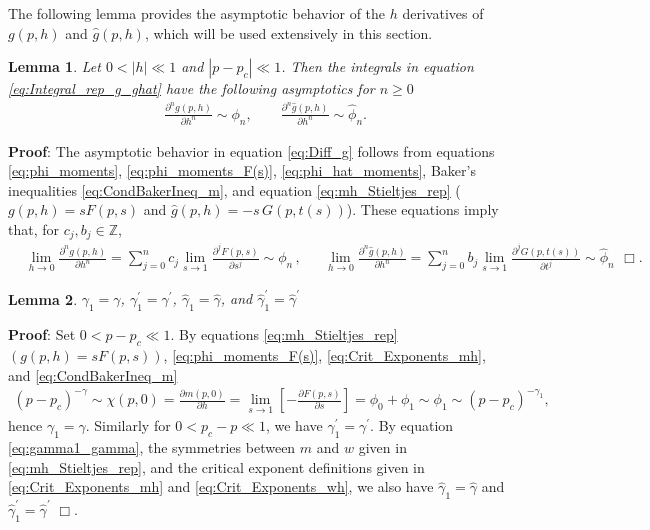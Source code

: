 \documentclass[english,12pt,jmp,graphicx]{revtex4-1}
\newtheorem{lemma}{Lemma}[section]
\newcommand{\ph}{\hat{\phi}}
\newcommand{\gh}{\hat{\gamma}}
\begin{document}
The following lemma provides the asymptotic behavior of the $h$
derivatives of $g(p,h)$ and $\hat{g}(p,h)$, which will be used
extensively in this section. 
\begin{lemma}\label{lem:h_diff_commutation}
   Let $0<|h|\ll1$ and $|p-p_c|\ll1$. Then the integrals in equation
   \eqref{eq:Integral_rep_g_ghat} have the following asymptotics for $n\geq0$
\begin{align}\label{eq:Diff_g}
  &\frac{\partial^ng(p,h)}{\partial h^n}\sim\phi_n, \qquad \frac{\partial^n\hat{g}(p,h)}{\partial h^n}\sim\ph_n.
\end{align}
\end{lemma}
%
\noindent \textbf{Proof}:
%
The asymptotic behavior in equation
\eqref{eq:Diff_g} follows from equations
\eqref{eq:phi_moments}, \eqref{eq:phi_moments_F(s)},
\eqref{eq:phi_hat_moments}, Baker's inequalities
\eqref{eq:CondBakerIneq_m}, and equation \eqref{eq:mh_Stieltjes_rep}
 ($g(p,h)=sF(p,s)$ and $\hat{g}(p,h)=-s\,G(p,t(s))$).
These equations imply that, for $c_j,b_j\in\mathbb{Z}$,  
%
\begin{align*}%
  &\lim_{h\to0}\frac{\partial^ng(p,h)}{\partial h^n}
         =\sum_{j=0}^nc_j\lim_{s\to1}\frac{\partial^jF(p,s)}{\partial s^j}\sim\phi_n\,,
  &&
  \lim_{h\to0}\frac{\partial^n\hat{g}(p,h)}{\partial h^n}
         =\sum_{j=0}^nb_j\lim_{s\to1}\frac{\partial^jG(p,t(s))}{\partial t^j}\sim\ph_n\, \ \Box.      
\end{align*}
\begin{lemma}\label{lem:nonzero_gamma1_etc}
  $\gamma_1=\gamma$, $\gamma_1^\prime=\gamma^\prime$, $\gh_1=\gh$, and $\gh_1^\prime=\gh^\prime$
\end{lemma}
%
\noindent \textbf{Proof}:
%
Set $0<p-p_c\ll1$. By equations \eqref{eq:mh_Stieltjes_rep}
$(g(p,h)=sF(p,s))$, \eqref{eq:phi_moments_F(s)},
\eqref{eq:Crit_Exponents_mh}, and \eqref{eq:CondBakerIneq_m} 
%
\begin{align}\label{eq:gamma1_gamma}
  (p-p_c)^{-\gamma}\sim\chi(p,0)
          =\frac{\partial m(p,0)}{\partial h}
          =\lim_{s\to1}\left[-\frac{\partial F(p,s)}{\partial s}\right]
          =\phi_0+\phi_1
          \sim\phi_1\sim(p-p_c)^{-\gamma_1},
\end{align}
%
hence $\gamma_1=\gamma$. Similarly for $0<p_c-p\ll1$, we have $\gamma_1^\prime=\gamma^\prime$. By
equation \eqref{eq:gamma1_gamma}, the symmetries between $m$ and
$w$ given in \eqref{eq:mh_Stieltjes_rep}, and the critical exponent
definitions given in \eqref{eq:Crit_Exponents_mh} and
\eqref{eq:Crit_Exponents_wh}, we also have $\gh_1=\gh$ and
$\gh_1^\prime=\gh^\prime$ $\Box$.    
\end{document}
